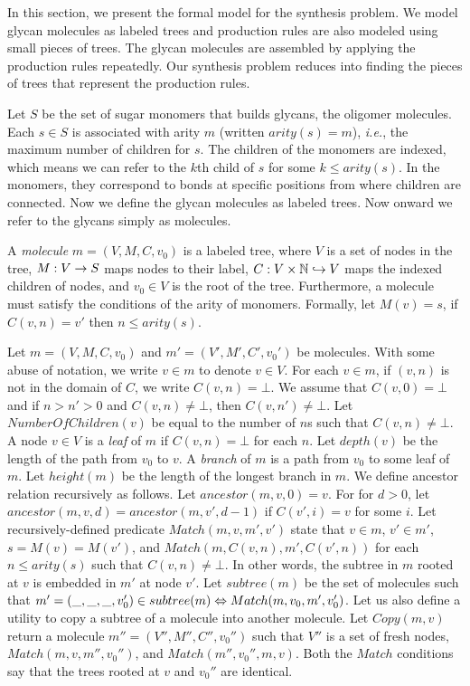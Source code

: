 
In this section, we present the formal model for the synthesis problem.
We model glycan molecules as labeled trees and production rules are also modeled using small pieces of trees. The glycan molecules are assembled by applying the production rules repeatedly.
Our synthesis problem reduces into finding the pieces of trees that represent the production rules.

Let $S$ be the set of sugar monomers that builds glycans,
the oligomer molecules. Each $s \in S$ is associated with arity $m$ 
(written $arity(s) = m$), {\em i.e.}, the maximum number of children for $s$. The children of the monomers are indexed, which means we can refer to the $k$th child of $s$ for some $k \leq arity(s)$.
In the monomers, they correspond to bonds at specific positions from where children are connected.
Now we define the glycan molecules as labeled trees. Now onward we refer to the glycans simply as molecules.

\begin{df}
A {\em molecule} $m = (V,M,C,v_0)$ is a labeled tree, where 
$V$ is a set of nodes in the tree,
$M : V \rightarrow S$ maps nodes to their label, 
$C : V \times \mathbb{N} \hookrightarrow V$ maps the indexed children of nodes, and
$v_0 \in V$ is the root of the tree.
Furthermore, a molecule must satisfy the conditions of the arity of monomers.
Formally, let $M(v) = s$, if $C(v,n) = v'$ then $n \leq arity(s)$.
\end{df}

Let $m = (V,M,C,v_0)$ and $m' = (V',M',C',v_0')$ be molecules.
With some abuse of notation, we write $v \in m$ to denote $v \in V$.
For each $v \in m$, if $(v,n)$ is not in the domain of $C$, we write $C(v,n) = \bot$.
We assume that $C(v,0) = \bot$ and if $n > n' > 0$ and $C(v,n) \neq \bot$, then $C(v,n') \neq \bot$.
Let $NumberOfChildren(v)$ be equal to the number of $n$s such that $C(v,n) \neq \bot$. 
A node $v \in V$ is a {\em leaf} of $m$ if $C(v,n) = \bot$ for each $n$.
Let $depth(v)$ be the length of the path from $v_0$ to $v$.
A {\em branch} of $m$ is a path from $v_0$ to some leaf of $m$.
Let $height(m)$ be the length of the longest branch in $m$.
We define ancestor relation recursively as follows. Let $ancestor(m,v,0) = v$.
For for $d > 0$, let $ancestor(m,v,d) = ancestor(m,v', d-1)$ if $C(v',i) = v$ for some $i$.
Let recursively-defined predicate $Match(m,v,m',v')$ state that 
$v \in m$, $v' \in m'$, $s = M(v) = M(v')$, and $Match( m, C(v,n), m', C(v',n) )$ for each $n \leq arity(s)$ such that $C(v,n) \neq \bot$.
In other words, the subtree in $m$ rooted at $v$ is embedded in $m'$ at node $v'$.
Let $subtree(m)$ be the set of molecules such that
$m' = (\_,\_,\_,v_0') \in subtree(m) \Leftrightarrow Match(m,v_0,m',v_0')$.
Let us also define a utility to copy a subtree of a molecule into another molecule.
Let $Copy(m,v)$ return a molecule $m'' = (V'',M'',C'',v_0'')$ such that 
$V''$ is a set of fresh nodes, $Match(m,v,m'',v_0'')$, and $Match(m'',v_0'',m,v)$.
Both the $Match$ conditions say that the trees rooted at
$v$ and $v_0''$ are identical.

